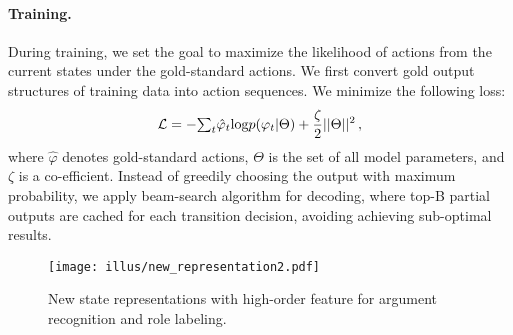 \documentclass[letterpaper]{article} \usepackage{aaai21}  \usepackage{times}  \usepackage{helvet} \usepackage{courier}  \usepackage[hyphens]{url}  \usepackage{graphicx} \urlstyle{rm} \def\UrlFont{\rm}  \usepackage{natbib}  \usepackage{caption}
\begin{document}
\begin{CJK}{UTF8}{gbsn}
\paragraph{Training.}
During training, we set the goal to maximize the likelihood of actions from the current states under the gold-standard actions.
We first convert gold output structures of training data into action sequences.
We minimize the following loss:
\begin{equation}
\setlength\abovedisplayskip{2pt}
\setlength\belowdisplayskip{2pt}
 \mathcal{L} = - \begin{matrix}\sum_{t} \end{matrix} \hat{\varphi}_t \text{log} p(\varphi_t | \Theta ) +  \frac{\zeta}{2}
 ||\Theta||^{2} \,,
\end{equation}
where $\hat{\varphi}$ denotes gold-standard actions,
$\Theta$ is the set of all model parameters,
and $\zeta$ is a co-efficient.
Instead of greedily choosing the output with maximum probability, we apply beam-search algorithm \cite{zhang-clark-2008-tale,LyuZJ16} for decoding, where top-B partial outputs are cached for each transition decision, avoiding achieving sub-optimal results.









\begin{figure}[!t]
\centering
\texttt{[image: illus/new\_representation2.pdf]}
\caption{
New state representations with high-order feature for argument recognition and role labeling.
}
\label{new-state}
\end{figure}







\end{CJK}
\end{document}
